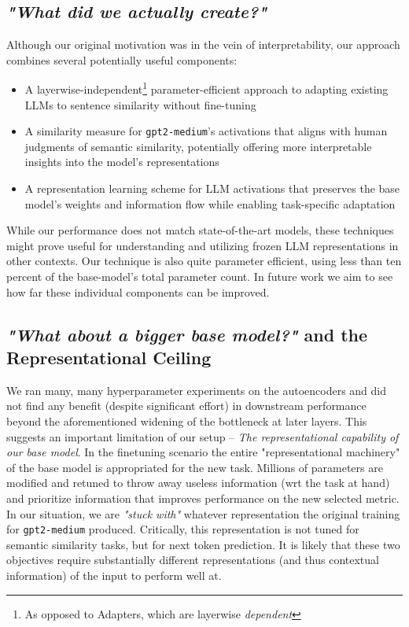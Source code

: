 \documentclass{article}
\begin{document}
\subsection{\textit{"What did we actually create?"}} \label{pathways}
Although our original motivation was in the vein of interpretability, our approach combines several potentially useful components:
\begin{itemize}
    \item A layerwise-independent\footnote{As opposed to Adapters, which are layerwise \textit{dependent}} parameter-efficient approach to adapting existing LLMs to sentence similarity without fine-tuning
    \item A similarity measure for \verb|gpt2-medium|'s activations that aligns with human judgments of semantic similarity, potentially offering more interpretable insights into the model's representations
    \item A representation learning scheme for LLM activations that preserves the base model's weights and information flow while enabling task-specific adaptation
\end{itemize}
While our performance does not match state-of-the-art models, these techniques might prove useful for understanding and utilizing frozen LLM representations in other contexts. Our technique is also quite parameter efficient, using less than ten percent of the base-model's total parameter count. In future work we aim to see how far these individual components can be improved. 

\subsection{\textit{"What about a bigger base model?"} and the Representational Ceiling}
We ran many, many hyperparameter experiments on the autoencoders and did not find any benefit (despite significant effort) in downstream performance beyond the aforementioned widening of the bottleneck at later layers. This suggests an important limitation of our setup -- \textit{The representational capability of our base model}. In the finetuning scenario the entire "representational machinery" of the base model is appropriated for the new task. Millions of parameters are modified and retuned to throw away useless information (wrt the task at hand) and prioritize information that improves performance on the new selected metric. In our situation, we are \textit{"stuck with"} whatever representation the original training for \verb|gpt2-medium| produced. Critically, this representation is not tuned for semantic similarity tasks, but for next token prediction. It is likely that these two objectives require substantially different representations (and thus contextual information) of the input to perform well at.
\end{document}
